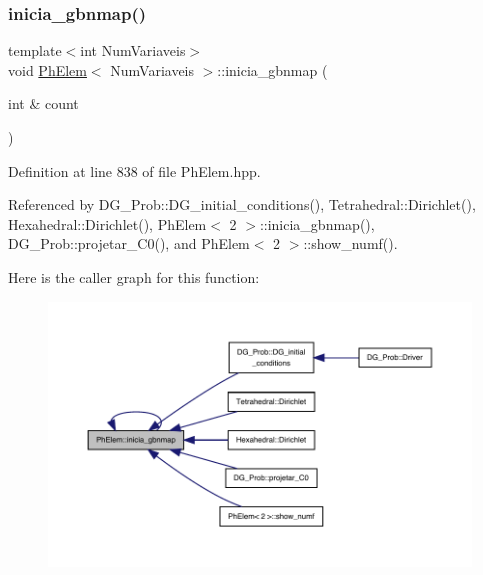 \subsubsection{\texorpdfstring{inicia\+\_\+gbnmap()}{inicia\_gbnmap()}\hspace{0.1cm}{\footnotesize\ttfamily [1/2]}}
{\footnotesize\ttfamily template$<$int Num\+Variaveis$>$ \\
void \hyperlink{classPhElem}{Ph\+Elem}$<$ Num\+Variaveis $>$\+::inicia\+\_\+gbnmap (\begin{DoxyParamCaption}\item[{int \&}]{count }\end{DoxyParamCaption})}



Definition at line 838 of file Ph\+Elem.\+hpp.



Referenced by D\+G\+\_\+\+Prob\+::\+D\+G\+\_\+initial\+\_\+conditions(), Tetrahedral\+::\+Dirichlet(), Hexahedral\+::\+Dirichlet(), Ph\+Elem$<$ 2 $>$\+::inicia\+\_\+gbnmap(), D\+G\+\_\+\+Prob\+::projetar\+\_\+\+C0(), and Ph\+Elem$<$ 2 $>$\+::show\+\_\+numf().

Here is the caller graph for this function\+:
\nopagebreak
\begin{figure}[H]
\begin{center}
\leavevmode
\includegraphics[width=350pt]{classPhElem_a98449dc77f691781f54fc8798bea03a3_icgraph}
\end{center}
\end{figure}
\mbox{\label{classPhElem_a3ed7c7027c6fadd45f29eb7de33ee7fb}} 
